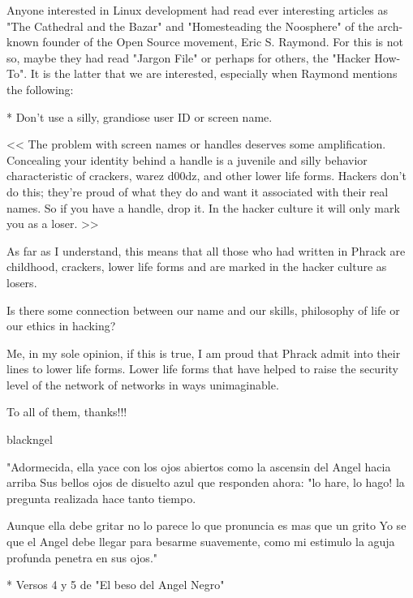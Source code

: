 \documentclass[12pt]{article}
\begin{document}
Anyone interested in Linux development had read ever interesting articles
as "The Cathedral and the Bazar" and "Homesteading the Noosphere" of the
arch-known founder of the Open Source movement, Eric S. Raymond. For this
is not so, maybe they had read "Jargon File" or perhaps for others, the
"Hacker How-To". It is the latter that we are interested, especially when
Raymond mentions the following:
\newline


   * Don't use a silly, grandiose user ID or screen name.
\begin{verbnobox}[\small]

   << The problem with screen names or handles deserves some
      amplification. Concealing your identity behind a handle
      is a juvenile and silly behavior characteristic of crackers,
      warez d00dz, and other lower life forms. Hackers don't do
      this; they're proud of what they do and want it associated
      with their real names. So if you have a handle, drop it.
      In the hacker culture it will only mark you as a loser. >>
\end{verbnobox}
	

As far as I understand, this means that all those who had written in
Phrack are childhood, crackers, lower life forms and are marked in the
hacker culture as losers.
\newline


Is there some connection between our name and our skills, philosophy
of life or our ethics in hacking? 
\newline


Me, in my sole opinion, if this is true, I am proud that Phrack admit into
their lines to lower life forms. Lower life forms that have helped to
raise the security level of the network of networks in ways unimaginable.
\newline

To all of them, thanks!!!
\newline

blackngel


\begin{verbnobox}[\small]

                         "Adormecida, ella yace
                          con los ojos abiertos
                como la ascensin del Angel hacia arriba
                    Sus bellos ojos de disuelto azul
                que responden ahora: "lo hare, lo hago!
                la pregunta realizada hace tanto tiempo.

                         Aunque ella debe gritar
                              no lo parece
                  lo que pronuncia es mas que un grito
                     Yo se que el Angel debe llegar
               para besarme suavemente, como mi estimulo
                la aguja profunda penetra en sus ojos."

              * Versos 4 y 5 de "El beso del Angel Negro"

\end{verbnobox}
\end{document}
